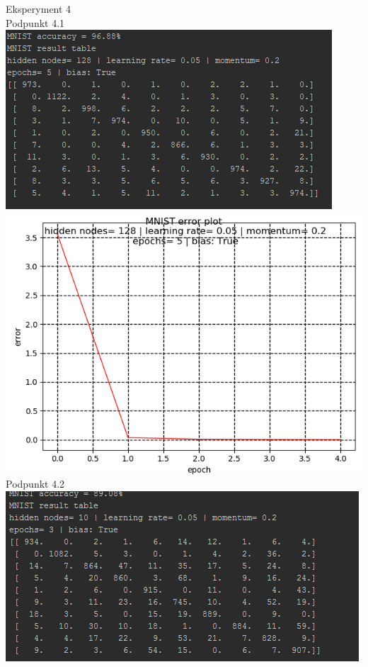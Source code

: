 \documentclass{classrep}
\begin{document}
{Eksperyment 4\\
Podpunkt 4.1\\
\includegraphics{imgs/MNIST1_1.png}\\
\includegraphics{imgs/MNIST1.png}\\
Podpunkt 4.2\\
\includegraphics{imgs/MNIST21.png}\\
}
\end{document}
